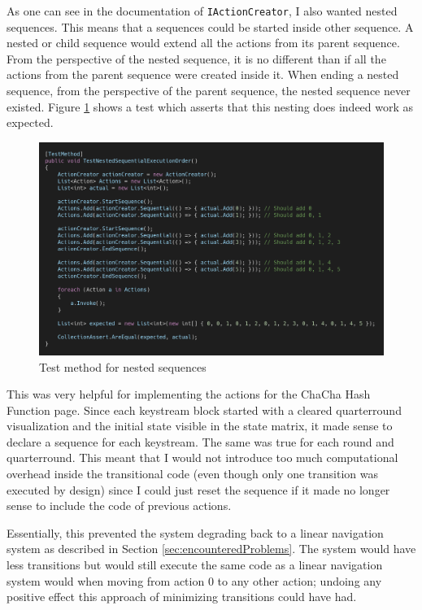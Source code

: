 As one can see in the documentation of \texttt{IActionCreator}, I also wanted nested sequences. This means that a sequences could be started inside other sequence. A nested or child sequence would extend all the actions from its parent sequence. From the perspective of the nested sequence, it is no different than if all the actions from the parent sequence were created inside it. When ending a nested sequence, from the perspective of the parent sequence, the nested sequence never existed. Figure \ref{fig:navsystem.test} shows a test which asserts that this nesting does indeed work as expected.
\begin{figure}
\centering
\caption{Test method for nested sequences}
\label{fig:navsystem.test}
\includegraphics[width=\textwidth]{figures/code/nav-arch/TestNestedSequentialExecutionOrder.png}
\end{figure}

This was very helpful for implementing the actions for the ChaCha Hash Function page. Since each keystream block started with a cleared quarterround visualization and the initial state visible in the state matrix, it made sense to declare a sequence for each keystream. The same was true for each round and quarterround. This meant that I would not introduce too much computational overhead inside the transitional code (even though only one transition was executed by design) since I could just reset the sequence if it made no longer sense to include the code of previous actions.

Essentially, this prevented the system degrading back to a linear navigation system as described in Section \ref{sec:encounteredProblems}. The system would have less transitions but would still execute the same code as a linear navigation system would when moving from action 0 to any other action; undoing any positive effect this approach of minimizing transitions could have had.

